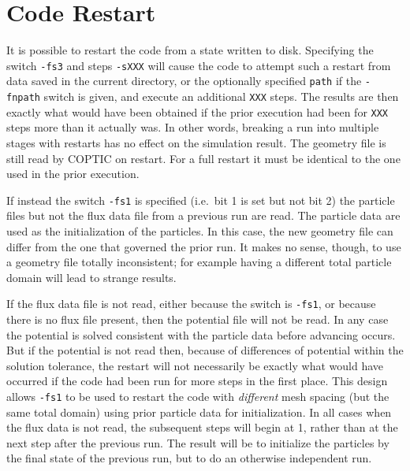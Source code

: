 \documentclass[12pt]{article}
\begin{document}
\section{Code Restart}

It is possible to restart the code from a state written to disk.
Specifying the switch \verb!-fs3! and steps \verb!-sXXX! will cause
the code to attempt such a restart from data saved in the current
directory, or the optionally specified \verb!path!  if the
\verb!-fnpath! switch is given, and execute an additional \verb!XXX!
steps.  The results are then exactly what would have been obtained if
the prior execution had been for \verb!XXX! steps more than it
actually was. In other words, breaking a run into multiple stages with
restarts has no effect on the simulation result. The geometry file is
still read by COPTIC on restart. For a full restart it must be
identical to the one used in the prior execution.


If instead the switch \verb!-fs1! is specified (i.e.\ bit 1 is set but
not bit 2) the particle files but not the flux data file from a previous
run are read. The particle data are used as the initialization of the
particles. In this case, the new geometry file can differ from the one
that governed the prior run. It makes no sense, though, to use a
geometry file totally inconsistent; for example having a different
total particle domain will lead to strange results.

If the flux data file is not read, either because the switch is
\verb!-fs1!, or because there is no flux file present, then the
potential file will not be read. In any case the potential is solved
consistent with the particle data before advancing occurs. But if the
potential is not read then, because of differences of potential
within the solution tolerance, the restart will not necessarily be exactly
what would have occurred if the code had been run for more steps in
the first place. This design allows \verb!-fs1! to be used to
restart the code with \emph{different} mesh spacing (but the same
total domain) using prior particle data for initialization.  In all
cases when the flux data is not read, the subsequent steps will begin
at 1, rather than at the next step after the previous run. The result
will be to initialize the particles by the final state of the
previous run, but to do an otherwise independent run.
\end{document}
